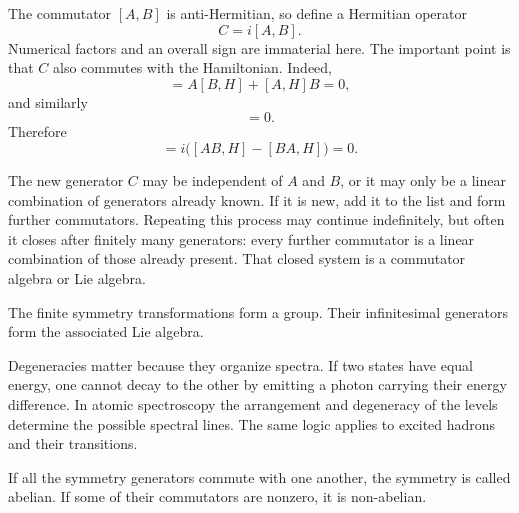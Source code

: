 The commutator \([A,B]\) is anti-Hermitian, so define a Hermitian operator
\begin{equation}
C=i[A,B].
\end{equation}
Numerical factors and an overall sign are immaterial here. The important point is that \(C\) also commutes with the Hamiltonian. Indeed,
\begin{equation}
[AB,H]
=A[B,H]+[A,H]B=0,
\end{equation}
and similarly
\begin{equation}
[BA,H]=0.
\end{equation}
Therefore
\begin{equation}
[C,H]
=i\bigl([AB,H]-[BA,H]\bigr)=0.
\end{equation}

The new generator \(C\) may be independent of \(A\) and \(B\), or it may only be a linear combination of generators already known. If it is new, add it to the list and form further commutators. Repeating this process may continue indefinitely, but often it closes after finitely many generators: every further commutator is a linear combination of those already present. That closed system is a commutator algebra or Lie algebra.

The finite symmetry transformations form a group. Their infinitesimal generators form the associated Lie algebra.

Degeneracies matter because they organize spectra. If two states have equal energy, one cannot decay to the other by emitting a photon carrying their energy difference. In atomic spectroscopy the arrangement and degeneracy of the levels determine the possible spectral lines. The same logic applies to excited hadrons and their transitions.

\begin{classroomqa}
\end{classroomqa}

If all the symmetry generators commute with one another, the symmetry is called abelian. If some of their commutators are nonzero, it is non-abelian.

\begin{classroomqa}
\end{classroomqa}

